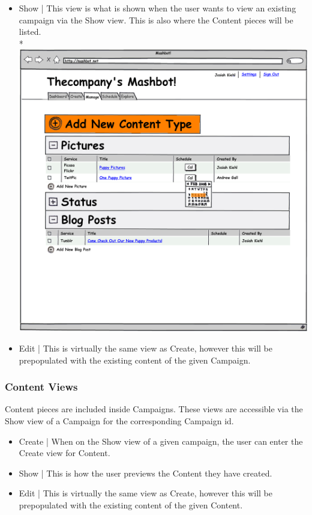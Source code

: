 \documentclass{article}
\begin{document}
\begin{itemize}
\item Show | This view is what is shown when the user wants to view an existing campaign via the Show view.  This is also where the Content pieces will be listed. \\*
  \includegraphics[width=\textwidth]{../mockups/manage-addcontent.png}
\item Edit | This is virtually the same view as Create, however this will be prepopulated with the existing content of the given Campaign.
\end{itemize}
\subsubsection{Content Views}
Content pieces are included inside Campaigns.  These views are accessible via the Show view of a Campaign for the corresponding Campaign id.
\begin{itemize}
\item Create | When on the Show view of a given campaign, the user can enter the Create view for Content.
\item Show | This is how the user previews the Content they have created.
\item Edit | This is virtually the same view as Create, however this will be prepopulated with the existing content of the given Content.
\end{itemize}
\end{document}
